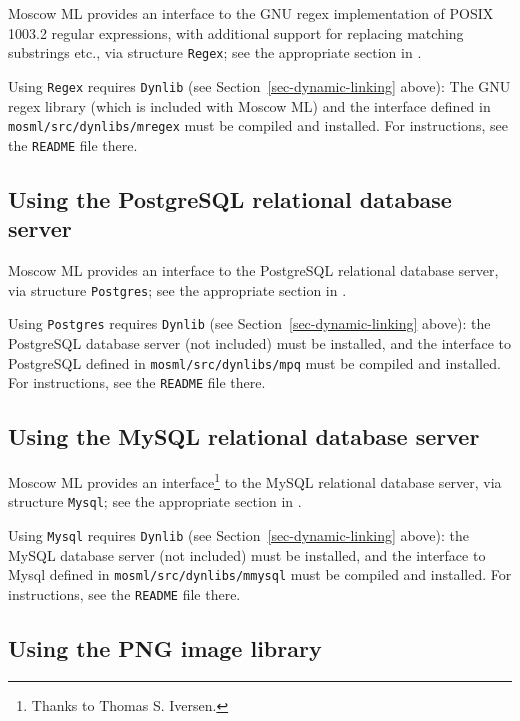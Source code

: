 \documentclass[fleqn]{article}
\begin{document}
Moscow ML provides an interface to the GNU regex implementation of
POSIX 1003.2 regular expressions, with additional support for
replacing matching substrings etc., via structure {\tt Regex}; see the
appropriate section in \cite{MoscowML:2000:MoscowMLLibrary}.

Using \texttt{Regex} requires {\tt Dynlib} (see
Section~\ref{sec-dynamic-linking} above): The GNU regex library (which is
included with Moscow ML) and the interface defined in {\tt
  mosml/src/dynlibs/mregex} must be compiled and installed.  For
instructions, see the {\tt README} file there.


\subsection{Using the PostgreSQL relational database server}
\label{sec-using-mpq}

Moscow ML provides an interface to the PostgreSQL relational database
server, via structure {\tt Postgres}; see the appropriate section in
\cite{MoscowML:2000:MoscowMLLibrary}.

Using \texttt{Postgres} requires {\tt Dynlib} (see
Section~\ref{sec-dynamic-linking} above): the PostgreSQL database server
(not included) must be installed, and the interface to PostgreSQL
defined in {\tt mosml/src/dynlibs/mpq} must be compiled and installed.
For instructions, see the {\tt README} file there.


\subsection{Using the MySQL relational database server}
\label{sec-using-mmysql}

Moscow ML provides an interface\footnote{Thanks to Thomas S.
  Iversen.} to the MySQL relational database server, via structure
{\tt Mysql}; see the appropriate section in
\cite{MoscowML:2000:MoscowMLLibrary}.

Using \texttt{Mysql} requires {\tt Dynlib} (see
Section~\ref{sec-dynamic-linking} above): the MySQL database server (not
included) must be installed, and the interface to Mysql defined in
{\tt mosml/src/dynlibs/mmysql} must be compiled and installed.  For
instructions, see the {\tt README} file there.


\subsection{Using the PNG image library}
\label{sec-using-mgd}
\end{document}
